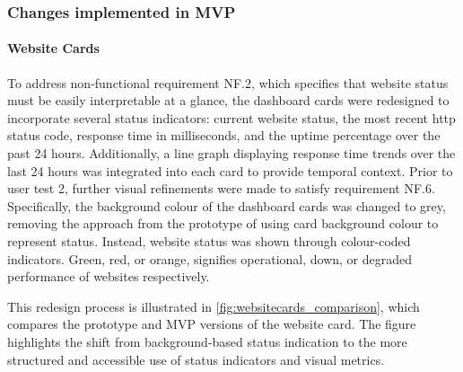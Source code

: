 \subsubsection{Changes implemented in MVP}

\paragraph{Website Cards}

To address non-functional requirement NF.2, which specifies that website status must be easily interpretable at a glance, the dashboard cards were redesigned to incorporate several status indicators: current website status, the most recent \gls{http} status code, response time in milliseconds, and the uptime percentage over the past 24 hours. Additionally, a line graph displaying response time trends over the last 24 hours was integrated into each card to provide temporal context. Prior to user test 2, further visual refinements were made to satisfy requirement NF.6. Specifically, the background colour of the dashboard cards was changed to grey, removing the approach from the prototype of using card background colour to represent status. Instead, website status was shown through colour-coded indicators. Green, red, or orange, signifies operational, down, or degraded performance of websites respectively.

This redesign process is illustrated in \autoref{fig:websitecards_comparison}, which compares the prototype and MVP versions of the website card. The figure highlights the shift from background-based status indication to the more structured and accessible use of status indicators and visual metrics.

